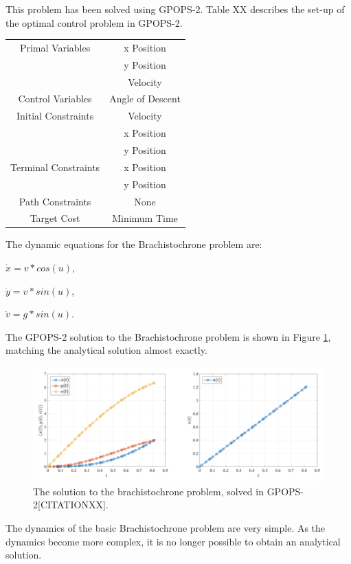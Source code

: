 This problem has been solved using GPOPS-2. Table XX describes the set-up of the optimal control problem in GPOPS-2. 
\begin{table}
\centering
\begin{tabular}{|c|c|}
	\hline Primal Variables  & x Position\\& y Position\\& Velocity\\ 
	\hline Control Variables  & Angle of Descent\\ 
	\hline Initial Constraints  & Velocity\\ & x Position\\ & y Position\\
	\hline Terminal Constraints &  x Position\\ & y Position\\
	\hline Path Constraints & None \\ 
	\hline Target Cost & Minimum Time \\ 
	\hline 
\end{tabular} 
\end{table}
The dynamic equations for the Brachistochrone problem are:

$\dot{x} = v*cos(u)$,

$\dot{y} = v*sin(u)$,

$\dot{v} = g*sin(u)$.

The GPOPS-2 solution to the Brachistochrone problem is shown in Figure \ref{fig:Brachistochrone}, matching the analytical solution almost exactly. 

\begin{figure}
\centering
\includegraphics[width=0.9\linewidth]{figures/4_LODESTAR/Brachistochrone}
\caption{The solution to the brachistochrone problem, solved in GPOPS-2[CITATIONXX].}
\label{fig:Brachistochrone}
\end{figure}



The dynamics of the basic Brachistochrone problem are very simple. As the dynamics become more complex, it is no longer possible to obtain an analytical solution. 

